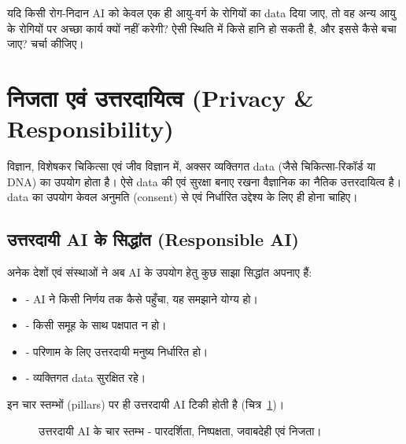 \begin{sochiye}
यदि किसी रोग-निदान AI को केवल एक ही आयु-वर्ग के रोगियों का data दिया जाए, तो वह अन्य
आयु के रोगियों पर अच्छा कार्य क्यों नहीं करेगी? ऐसी स्थिति में किसे हानि हो सकती है,
और इससे कैसे बचा जाए? चर्चा कीजिए।
\end{sochiye}

\section{निजता एवं उत्तरदायित्व (Privacy \& Responsibility)}

विज्ञान, विशेषकर चिकित्सा एवं जीव विज्ञान में, अक्सर व्यक्तिगत data (जैसे चिकित्सा-रिकॉर्ड
या DNA) का उपयोग होता है। ऐसे data की  एवं सुरक्षा बनाए रखना
वैज्ञानिक का नैतिक उत्तरदायित्व है। data का उपयोग केवल अनुमति (consent) से एवं निर्धारित
उद्देश्य के लिए ही होना चाहिए।

\subsection{उत्तरदायी AI के सिद्धांत (Responsible AI)}
अनेक देशों एवं संस्थाओं ने अब AI के उपयोग हेतु कुछ साझा सिद्धांत अपनाए हैं:
\begin{itemize}[leftmargin=1.4em]
  \item {} - AI ने किसी निर्णय तक कैसे पहुँचा, यह
        समझाने योग्य हो।
  \item {} - किसी समूह के साथ पक्षपात न हो।
  \item {} - परिणाम के लिए उत्तरदायी मनुष्य निर्धारित हो।
  \item {} - व्यक्तिगत data सुरक्षित रहे।
\end{itemize}

इन चार स्तम्भों (pillars) पर ही उत्तरदायी AI टिकी होती है (चित्र~\ref{fig:responsible-ai})।

\begin{figure}[h]
\centering
{}
\caption{उत्तरदायी AI के चार स्तम्भ - पारदर्शिता, निष्पक्षता, जवाबदेही एवं निजता।}
\label{fig:responsible-ai}
\end{figure}

